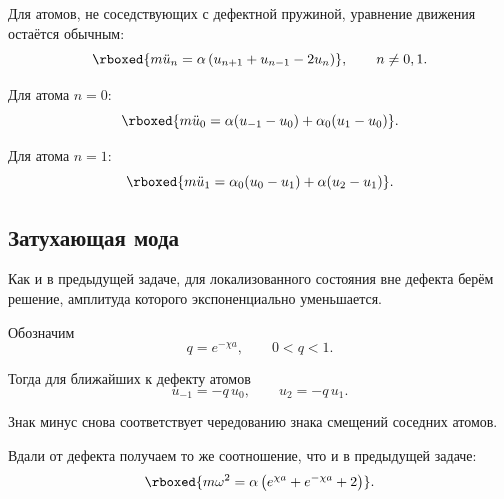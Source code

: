 \documentclass[../final.tex]{subfiles}
\begin{document}
Для атомов, не соседствующих с дефектной пружиной,
уравнение движения остаётся обычным:
%
\begin{equation*}
    \rboxed{
        m\ddot u_n
        =
        \alpha
        \left(
            u_{n+1}
            +
            u_{n-1}
            -
            2u_n
        \right)
    },
    \qquad
    n\neq0,1.
\end{equation*}

Для атома $n=0$:
%
\begin{equation*}
    \rboxed{
        m\ddot u_0
        =
        \alpha(u_{-1}-u_0)
        +
        \alpha_0(u_1-u_0)
    }.
\end{equation*}

Для атома $n=1$:
%
\begin{equation*}
    \rboxed{
        m\ddot u_1
        =
        \alpha_0(u_0-u_1)
        +
        \alpha(u_2-u_1)
    }.
\end{equation*}



\subsection*{Затухающая мода}

Как и в предыдущей задаче,
для локализованного состояния вне дефекта берём решение,
амплитуда которого экспоненциально уменьшается.

Обозначим
%
\begin{equation*}
    q=e^{-\chi a},
    \qquad
    0<q<1.
\end{equation*}

Тогда для ближайших к дефекту атомов
%
\begin{equation*}
    u_{-1}
    =
    -q\,u_0,
    \qquad
    u_2
    =
    -q\,u_1.
\end{equation*}

Знак минус снова соответствует чередованию знака
смещений соседних атомов.

Вдали от дефекта получаем то же соотношение,
что и в предыдущей задаче:
%
\begin{equation*}
    \rboxed{
        m\omega^2
        =
        \alpha
        \left(
            e^{\chi a}
            +
            e^{-\chi a}
            +
            2
        \right)
    }.
\end{equation*}
\end{document}
